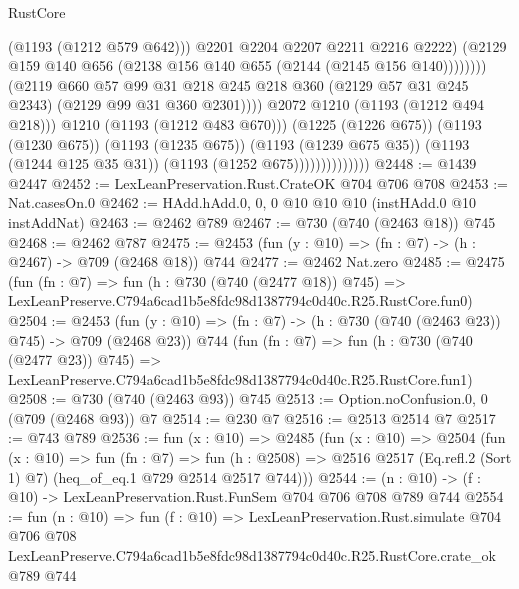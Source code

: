 \begin{lexlean}{RustCore}
\begin{coremodule}
                                                (@1193 (@1212 @579 @642)))
                                              @2201
                                              @2204
                                              @2207
                                              @2211
                                              @2216
                                              @2222)
                                            (@2129
                                              @159
                                              @140
                                              @656
                                              (@2138 @156 @140 @655 (@2144 (@2145 @156 @140))))))))
                                    (@2119
                                      @660
                                      @57
                                      @99
                                      @31
                                      @218
                                      @245
                                      @218
                                      @360
                                      (@2129 @57 @31 @245 @2343)
                                      (@2129 @99 @31 @360 @2301))))
                                @2072
                                @1210
                                (@1193 (@1212 @494 @218)))
                              @1210
                              (@1193 (@1212 @483 @670)))
                            (@1225 (@1226 @675))
                            (@1193 (@1230 @675))
                            (@1193 (@1235 @675))
                            (@1193 (@1239 @675 @35))
                            (@1193 (@1244 @125 @35 @31))
                            (@1193 (@1252 @675))))))))))))))
@2448 := @1439 @2447
@2452 := LexLeanPreservation.Rust.CrateOK @704 @706 @708
@2453 := Nat.casesOn.{0}
@2462 := HAdd.hAdd.{0, 0, 0} @10 @10 @10 (instHAdd.{0} @10 instAddNat)
@2463 := @2462 @789
@2467 := @730 (@740 (@2463 @18)) @745
@2468 := @2462 @787
@2475 := @2453 (fun (y : @10) => (fn : @7) -> (h : @2467) -> @709 (@2468 @18)) @744
@2477 := @2462 Nat.zero
@2485 := @2475
    (fun (fn : @7) =>
    fun (h : @730 (@740 (@2477 @18)) @745) =>
    LexLeanPreserve.C794a6cad1b5e8fdc98d1387794c0d40c.R25.RustCore.fun0)
@2504 := @2453
    (fun (y : @10) => (fn : @7) -> (h : @730 (@740 (@2463 @23)) @745) -> @709 (@2468 @23))
    @744
    (fun (fn : @7) =>
    fun (h : @730 (@740 (@2477 @23)) @745) =>
    LexLeanPreserve.C794a6cad1b5e8fdc98d1387794c0d40c.R25.RustCore.fun1)
@2508 := @730 (@740 (@2463 @93)) @745
@2513 := Option.noConfusion.{0, 0} (@709 (@2468 @93)) @7
@2514 := @230 @7
@2516 := @2513 @2514 @7
@2517 := @743 @789
@2536 := fun (x : @10) =>
  @2485
    (fun (x : @10) =>
    @2504
      (fun (x : @10) =>
      fun (fn : @7) =>
      fun (h : @2508) =>
      @2516 @2517 (Eq.refl.{2} (Sort 1) @7) (heq_of_eq.{1} @729 @2514 @2517 @744)))
@2544 := (n : @10) -> (f : @10) -> LexLeanPreservation.Rust.FunSem @704 @706 @708 @789 @744
@2554 := fun (n : @10) =>
  fun (f : @10) =>
  LexLeanPreservation.Rust.simulate
    @704
    @706
    @708
    LexLeanPreserve.C794a6cad1b5e8fdc98d1387794c0d40c.R25.RustCore.crate_ok
    @789
    @744
\end{coremodule}
\end{lexlean}
